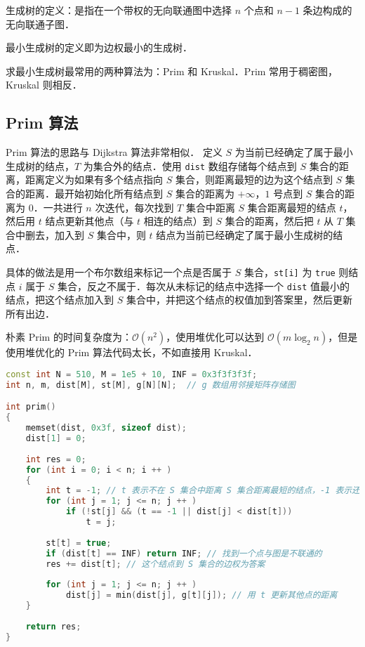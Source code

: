 
\begin{issues}
\issueMissDepend
\issueDraft
\end{issues}

生成树的定义：是指在一个带权的无向联通图中选择 $n$ 个点和 $n - 1$ 条边构成的无向联通子图．

最小生成树的定义即为边权最小的生成树．

求最小生成树最常用的两种算法为：Prim 和 Kruskal．Prim 常用于稠密图，Kruskal 则相反．

\subsection{Prim 算法}

Prim 算法的思路与 Dijkstra 算法非常相似．
定义 $S$ 为当前已经确定了属于最小生成树的结点，$T$ 为集合外的结点．使用 \verb|dist| 数组存储每个结点到 $S$ 集合的距离，距离定义为如果有多个结点指向 $S$ 集合，则距离最短的边为这个结点到 $S$ 集合的距离．最开始初始化所有结点到 $S$ 集合的距离为 $+\infty$，$1$ 号点到 $S$ 集合的距离为 $0$．一共进行 $n$ 次迭代，每次找到 $T$ 集合中距离 $S$ 集合距离最短的结点 $t$，然后用 $t$ 结点更新其他点（与 $t$ 相连的结点）到 $S$ 集合的距离，然后把 $t$ 从 $T$ 集合中删去，加入到 $S$ 集合中，则 $t$ 结点为当前已经确定了属于最小生成树的结点．

具体的做法是用一个布尔数组来标记一个点是否属于 $S$ 集合，\verb|st[i]| 为 \verb|true| 则结点 $i$ 属于 $S$ 集合，反之不属于．每次从未标记的结点中选择一个 \verb|dist| 值最小的结点，把这个结点加入到 $S$ 集合中，并把这个结点的权值加到答案里，然后更新所有出边．

朴素 Prim 的时间复杂度为：$\mathcal{O}(n^2)$，使用堆优化可以达到 $\mathcal{O}(m \log_2 n)$，但是使用堆优化的 Prim 算法代码太长，不如直接用 Kruskal．

\begin{lstlisting}[language=cpp]
const int N = 510, M = 1e5 + 10, INF = 0x3f3f3f3f;
int n, m, dist[M], st[M], g[N][N];  // g 数组用邻接矩阵存储图

int prim()
{
    memset(dist, 0x3f, sizeof dist);
    dist[1] = 0;
    
    int res = 0;
    for (int i = 0; i < n; i ++ )
    {
        int t = -1; // t 表示不在 S 集合中距离 S 集合距离最短的结点，-1 表示还没找到
        for (int j = 1; j <= n; j ++ )
            if (!st[j] && (t == -1 || dist[j] < dist[t]))  
                t = j;  
        
        st[t] = true;
        if (dist[t] == INF) return INF; // 找到一个点与图是不联通的
        res += dist[t]; // 这个结点到 S 集合的边权为答案
        
        for (int j = 1; j <= n; j ++ )
            dist[j] = min(dist[j], g[t][j]); // 用 t 更新其他点的距离
    }
     
    return res;
}
\end{lstlisting}

